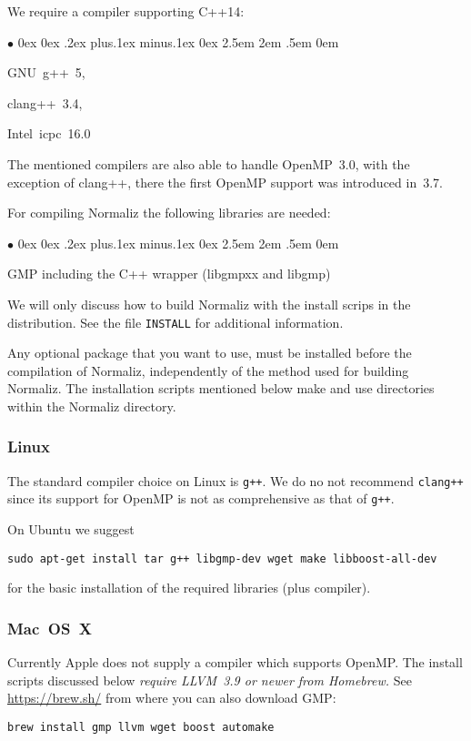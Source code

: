 \documentclass[12pt,a4paper]{scrartcl}
\newcommand{\stdli}{ \topsep0ex \partopsep0ex %
\parsep.2ex plus.1ex minus.1ex \itemsep0ex%
\leftmargin2.5em \labelwidth2em \labelsep.5em \rightmargin0em}%
\renewenvironment{itemize}{\begin{list}{{$\bullet$}}{\stdli}}{\end{list}}
\theoremstyle{definition}
\begin{document}
We require a compiler supporting C++14:
\begin{itemize}
	\item GNU~g++~5,
	\item clang++~3.4,
	\item Intel~icpc~16.0
\end{itemize}
The mentioned compilers are also able to handle OpenMP~3.0, with the exception of clang++, there the first OpenMP support was introduced in~3.7.

For compiling Normaliz the following libraries are needed:
\begin{itemize}
	\item GMP including the C++ wrapper (libgmpxx and libgmp)
\end{itemize}

We will only discuss how to build Normaliz with the install scrips in the distribution. See the file \verb|INSTALL| for additional information.

Any optional package that you want to use, must be installed before the compilation of Normaliz, independently of the method used for building Normaliz. The installation scripts mentioned below make and use directories within the Normaliz directory.

\subsubsection{Linux}
The standard compiler choice on Linux is \verb|g++|. We do no not recommend \verb|clang++| since its support for OpenMP is not as comprehensive as that of \verb|g++|.

On Ubuntu we suggest
\begin{Verbatim}
sudo apt-get install tar g++ libgmp-dev wget make libboost-all-dev
\end{Verbatim}
for the basic installation of the required libraries (plus compiler).

\subsubsection{Mac~OS~X}\label{mac}

Currently Apple does not supply a compiler which supports OpenMP.
The install scripts discussed below \emph{require LLVM~3.9 or newer from Homebrew.} See
\url{https://brew.sh/} from where you can also download GMP:

\begin{Verbatim}
brew install gmp llvm wget boost automake
\end{Verbatim}
\end{document}
